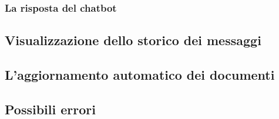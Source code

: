 \subsubsection{La risposta del chatbot}


\subsection{Visualizzazione dello storico dei messaggi}


\subsection{L'aggiornamento automatico dei documenti}


\subsection{Possibili errori}
